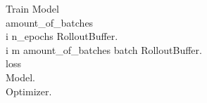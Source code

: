 \renewcommand{\thepseudonum}{\roman{pseudonum}}
\begin{pseudocode}{Train Model}{ }
\\

amount\_of\_batches \GETS {}\\
\FOR i  \TO n\_epochs \DO
\BEGIN
RolloutBuffer.\\
\FOR i \GETS m \TO amount\_of\_batches \DO
\BEGIN
batch \GETS RolloutBuffer.\\
loss \GETS {}\\
Model.\\
Optimizer.\\
\END\\
\END
\ENDPROCEDURE

\end{pseudocode}




